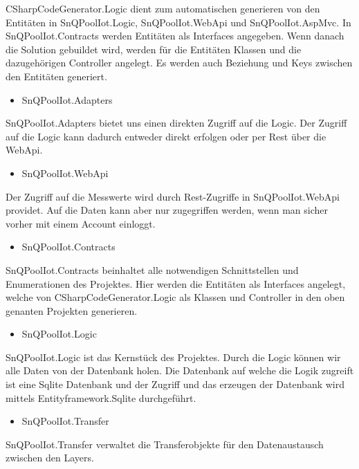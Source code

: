 CSharpCodeGenerator.Logic dient zum automatischen generieren von den Entitäten 
in SnQPoolIot.Logic, SnQPoolIot.WebApi und SnQPoolIot.AspMvc.
In SnQPoolIot.Contracts werden Entitäten als Interfaces angegeben.
Wenn danach die Solution gebuildet wird, werden für die Entitäten Klassen und die dazugehörigen Controller angelegt.
Es werden auch Beziehung und Keys zwischen den Entitäten generiert.


\begin{itemize}
    \item SnQPoolIot.Adapters
\end{itemize}

SnQPoolIot.Adapters bietet uns einen direkten Zugriff auf die Logic.
Der Zugriff auf die Logic kann dadurch entweder direkt erfolgen oder per Rest über die WebApi.

\begin{itemize}
    \item SnQPoolIot.WebApi
\end{itemize}

Der Zugriff auf die Messwerte wird durch Rest-Zugriffe in SnQPoolIot.WebApi providet.
Auf die Daten kann aber nur zugegriffen werden, wenn man sicher vorher mit einem Account einloggt.  

\begin{itemize}
    \item SnQPoolIot.Contracts
\end{itemize}

SnQPoolIot.Contracts beinhaltet alle notwendigen Schnittstellen und Enumerationen des Projektes.
Hier werden die Entitäten als Interfaces angelegt, 
welche von CSharpCodeGenerator.Logic als Klassen und Controller in den oben genanten Projekten generieren.

\begin{itemize}
    \item SnQPoolIot.Logic
\end{itemize}

SnQPoolIot.Logic ist das Kernstück des Projektes. 
Durch die Logic können wir alle Daten von der Datenbank holen. 
Die Datenbank auf welche die Logik zugreift ist eine Sqlite Datenbank und der Zugriff und das erzeugen der Datenbank wird mittels Entityframework.Sqlite durchgeführt.

\begin{itemize}
    \item SnQPoolIot.Transfer
\end{itemize}

SnQPoolIot.Transfer verwaltet die Transferobjekte für den Datenaustausch zwischen den Layers.

